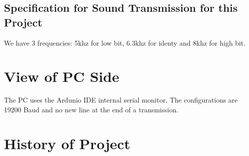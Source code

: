 \documentclass{book}
\begin{document}
\section{Specification for Sound Transmission for this Project}
We have 3 frequencies: 5khz for low bit, 6.3khz for identy and 8khz for high bit.

\chapter{View of PC Side}
The PC uses the Ardunio IDE internal serial monitor. The configurations are 19200 Baud and no new line at the end of a transmission.

\chapter{History of Project}
\end{document}
